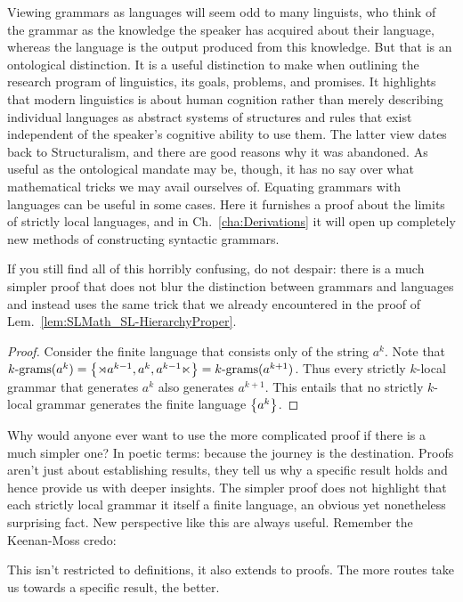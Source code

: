 Viewing grammars as languages will seem odd to many linguists, who think of the grammar as the knowledge the speaker has acquired about their language, whereas the language is the output produced from this knowledge.
But that is an ontological distinction.
It is a useful distinction to make when outlining the research program of linguistics, its goals, problems, and promises.
It highlights that modern linguistics is about human cognition rather than merely describing individual languages as abstract systems of structures and rules that exist independent of the speaker's cognitive ability to use them.
The latter view dates back to Structuralism, and there are good reasons why it was abandoned.
As useful as the ontological mandate may be, though, it has no say over what mathematical tricks we may avail ourselves of.
Equating grammars with languages can be useful in some cases.
Here it furnishes a proof about the limits of strictly local languages, and in Ch.~\ref{cha:Derivations} it will open up completely new methods of constructing syntactic grammars.

If you still find all of this horribly confusing, do not despair:
there is a much simpler proof that does not blur the distinction between grammars and languages and instead uses the same trick that we already encountered in the proof of Lem.~\ref{lem:SLMath_SL-HierarchyProper}.
%
\begin{proof}
    Consider the finite language that consists only of the string $a^k$.
    Note that $\Bigrams[k](a^k) = \setof{\LeftEdge a^{k-1}, a^k, a^{k-1} \RightEdge} = \Bigrams[k](a^{k+1})$.
    Thus every strictly $k$-local grammar that generates $a^k$ also generates $a^{k+1}$.
    This entails that no strictly $k$-local grammar generates the finite language $\setof{a^k}$.
\end{proof}
%
Why would anyone ever want to use the more complicated proof if there is a much simpler one?
In poetic terms: because the journey is the destination.
Proofs aren't just about establishing results, they tell us why a specific result holds and hence provide us with deeper insights.
The simpler proof does not highlight that each strictly local grammar it itself a finite language, an obvious yet nonetheless surprising fact.
New perspective like this are always useful.
Remember the Keenan-Moss credo:
%
\begin{center}
\end{center}
%
This isn't restricted to definitions, it also extends to proofs.
The more routes take us towards a specific result, the better.

